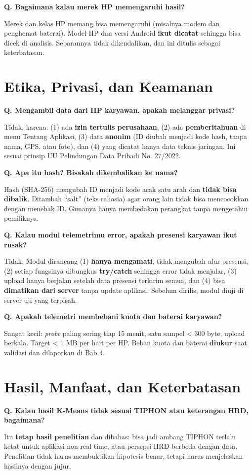 \documentclass[11pt,a4paper]{article}
\newcounter{q}
\newcommand{\tanya}[2]{\stepcounter{q}%
\par\vspace{6pt}\noindent\colorbox{band}{\parbox{\dimexpr\linewidth-2\fboxsep}{\textbf{Q\arabic{q}. #1}}}\par\vspace{2pt}#2\par}
\begin{document}
\tanya{Bagaimana kalau merek HP memengaruhi hasil?}{Merek dan kelas HP memang bisa memengaruhi (misalnya modem dan penghemat baterai). Model HP dan versi Android \textbf{ikut dicatat} sehingga bisa dicek di analisis. Sebarannya tidak dikendalikan, dan ini ditulis sebagai keterbatasan.}

\section{Etika, Privasi, dan Keamanan}

\tanya{Mengambil data dari HP karyawan, apakah melanggar privasi?}{Tidak, karena: (1) ada \textbf{izin tertulis perusahaan}, (2) ada \textbf{pemberitahuan} di menu Tentang Aplikasi, (3) data \textbf{anonim} (ID diubah menjadi kode hash, tanpa nama, GPS, atau foto), dan (4) yang dicatat hanya data teknis jaringan. Ini sesuai prinsip UU Pelindungan Data Pribadi No. 27/2022.}

\tanya{Apa itu hash? Bisakah dikembalikan ke nama?}{Hash (SHA-256) mengubah ID menjadi kode acak satu arah dan \textbf{tidak bisa dibalik}. Ditambah ``salt'' (teks rahasia) agar orang lain tidak bisa mencocokkan dengan menebak ID. Gunanya hanya membedakan perangkat tanpa mengetahui pemiliknya.}

\tanya{Kalau modul telemetrimu error, apakah presensi karyawan ikut rusak?}{Tidak. Modul dirancang (1) \textbf{hanya mengamati}, tidak mengubah alur presensi, (2) setiap fungsinya dibungkus \textbf{try/catch} sehingga error tidak menjalar, (3) upload hanya berjalan setelah data presensi terkirim semua, dan (4) bisa \textbf{dimatikan dari server} tanpa update aplikasi. Sebelum dirilis, modul diuji di server uji yang terpisah.}

\tanya{Apakah telemetri membebani kuota dan baterai karyawan?}{Sangat kecil: \textit{probe} paling sering tiap 15 menit, satu sampel < 300 byte, upload berkala. Target < 1 MB per hari per HP. Beban kuota dan baterai \textbf{diukur} saat validasi dan dilaporkan di Bab 4.}

\section{Hasil, Manfaat, dan Keterbatasan}

\tanya{Kalau hasil K-Means tidak sesuai TIPHON atau keterangan HRD, bagaimana?}{Itu \textbf{tetap hasil penelitian} dan dibahas: bisa jadi ambang TIPHON terlalu ketat untuk aplikasi non-real-time, atau persepsi HRD berbeda dengan data. Penelitian tidak harus membuktikan hipotesis benar, tetapi harus menjelaskan hasilnya dengan jujur.}
\end{document}
